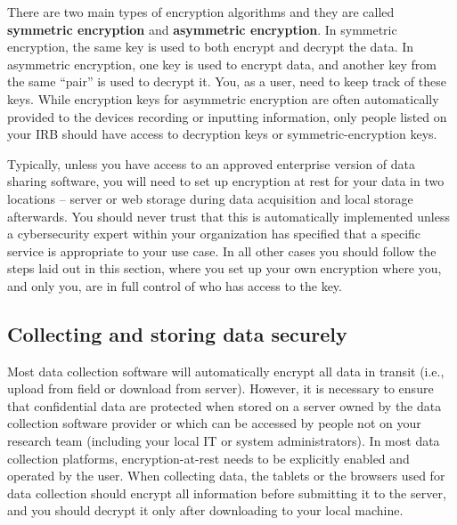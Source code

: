There are two main types of encryption algorithms and they are called
\textbf{symmetric encryption}
and \textbf{asymmetric encryption}.
In symmetric encryption,
the same key is used to both encrypt and decrypt the data.
In asymmetric encryption, one key is used to encrypt data,
and another key from the same ``pair'' is used to decrypt it.
You, as a user, need to keep track of these keys.
While encryption keys for asymmetric encryption are often
automatically provided to the devices recording or inputting information,
only people listed on your IRB should have access to decryption keys
or symmetric-encryption keys.

Typically, unless you have access to an approved
enterprise version of data sharing software,
you will need to set up encryption at rest for your data
in two locations --
server or web storage during data acquisition and local storage afterwards.
You should never trust that this is automatically implemented
unless a cybersecurity expert within your organization
has specified that a specific service is appropriate to your use case.
In all other cases you should follow the steps laid out in this section,
where you set up your own encryption
where you, and only you, are in full control of who has access to the key.

\subsection{Collecting and storing data securely}

Most data collection software will automatically encrypt
all data in transit (i.e., upload from field or download from server).
However, it is necessary to ensure that confidential data
are protected when stored on a server
owned by the data collection software provider
or which can be accessed by people not on your research team
(including your local IT or system administrators).
In most data collection platforms,
encryption-at-rest needs to be explicitly enabled and operated by the user.
When collecting data, the tablets or the browsers used for data collection
should encrypt all information before submitting it to the server,
and you should decrypt it only after downloading to your local machine.

